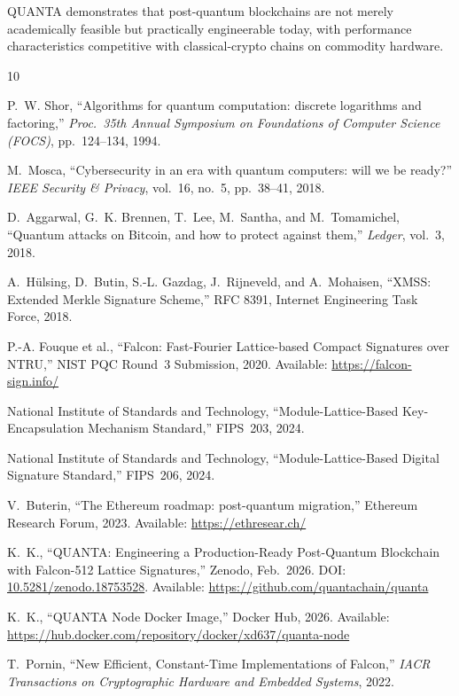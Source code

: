 \documentclass[11pt,a4paper]{article}
\begin{document}
QUANTA demonstrates that post-quantum blockchains are not merely academically
feasible but practically engineerable today, with performance characteristics
competitive with classical-crypto chains on commodity hardware.

\begin{thebibliography}{10}

P.~W. Shor,
``Algorithms for quantum computation: discrete logarithms and factoring,''
\textit{Proc.\ 35th Annual Symposium on Foundations of Computer Science (FOCS)},
pp.~124--134, 1994.

M.~Mosca,
``Cybersecurity in an era with quantum computers: will we be ready?''
\textit{IEEE Security \& Privacy}, vol.~16, no.~5, pp.~38--41, 2018.

D.~Aggarwal, G.~K. Brennen, T.~Lee, M.~Santha, and M.~Tomamichel,
``Quantum attacks on Bitcoin, and how to protect against them,''
\textit{Ledger}, vol.~3, 2018.

A.~Hülsing, D.~Butin, S.-L. Gazdag, J.~Rijneveld, and A.~Mohaisen,
``XMSS: Extended Merkle Signature Scheme,''
RFC 8391, Internet Engineering Task Force, 2018.

P.-A. Fouque et al.,
``Falcon: Fast-Fourier Lattice-based Compact Signatures over NTRU,''
NIST PQC Round~3 Submission, 2020.
Available: \url{https://falcon-sign.info/}

National Institute of Standards and Technology,
``Module-Lattice-Based Key-Encapsulation Mechanism Standard,''
FIPS~203, 2024.

National Institute of Standards and Technology,
``Module-Lattice-Based Digital Signature Standard,''
FIPS~206, 2024.

V.~Buterin,
``The Ethereum roadmap: post-quantum migration,''
Ethereum Research Forum, 2023.
Available: \url{https://ethresear.ch/}

K.~K.,
``QUANTA: Engineering a Production-Ready Post-Quantum Blockchain with Falcon-512 Lattice Signatures,''
Zenodo, Feb.\ 2026.
DOI: \href{https://doi.org/10.5281/zenodo.18753528}{10.5281/zenodo.18753528}.
Available: \url{https://github.com/quantachain/quanta}

K.~K.,
``QUANTA Node Docker Image,''
Docker Hub, 2026.
Available: \url{https://hub.docker.com/repository/docker/xd637/quanta-node}

T.~Pornin,
``New Efficient, Constant-Time Implementations of Falcon,''
\textit{IACR Transactions on Cryptographic Hardware and Embedded Systems}, 2022.

\end{thebibliography}
\end{document}
